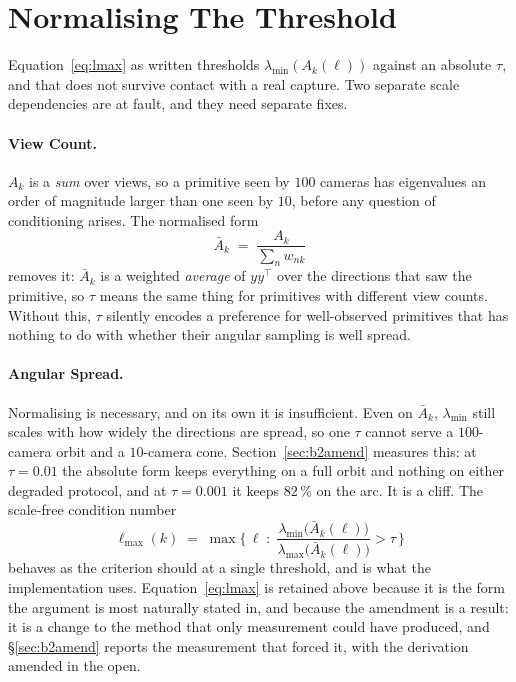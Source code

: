 
\section{Normalising The Threshold}
\label{sec:b2scale}

Equation~\eqref{eq:lmax} as written thresholds $\lambda_{\min}(A_k(\ell))$
against an absolute $\tau$, and that does not survive contact with a real
capture. Two separate scale dependencies are at fault, and they need separate
fixes.

\paragraph{View Count.} $A_k$ is a \emph{sum} over views, so a primitive seen by
$100$ cameras has eigenvalues an order of magnitude larger than one seen by $10$,
before any question of conditioning arises. The normalised form
\begin{equation}
  \bar A_k \;=\; \frac{A_k}{\sum_n w_{nk}}
  \label{eq:gramnorm}
\end{equation}
removes it: $\bar A_k$ is a weighted \emph{average} of $y y^{\!\top}$ over the
directions that saw the primitive, so $\tau$ means the same thing for primitives
with different view counts. Without this, $\tau$ silently encodes a preference
for well-observed primitives that has nothing to do with whether their angular
sampling is well spread.

\paragraph{Angular Spread.} Normalising is necessary, and on its own it is insufficient. Even on
$\bar A_k$, $\lambda_{\min}$ still scales with how widely the directions are
spread, so one $\tau$ cannot serve a $100$-camera orbit and a $10$-camera cone.
Section~\ref{sec:b2amend} measures this: at $\tau = 0.01$ the absolute form keeps
everything on a full orbit and nothing on either degraded protocol, and at
$\tau = 0.001$ it keeps $82\,\%$ on the arc. It is a cliff. The scale-free condition number
\begin{equation}
  \ell_{\max}(k) \;=\; \max\Big\{\, \ell \;:\;
  \frac{\lambda_{\min}\big(\bar A_k(\ell)\big)}{\lambda_{\max}\big(\bar A_k(\ell)\big)} > \tau \,\Big\}
  \label{eq:lmaxcond}
\end{equation}
behaves as the criterion should at a single threshold, and is what the
implementation uses. Equation~\eqref{eq:lmax} is retained above because it is
the form the argument is most naturally stated in, and because the amendment is
a result: it is a change to the method that only measurement could have
produced, and \S\ref{sec:b2amend} reports the measurement that forced it, with the
derivation amended in the open.

